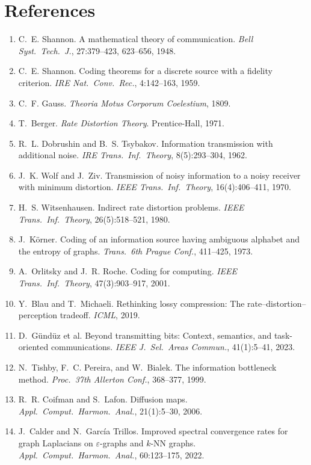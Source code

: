 \documentclass[lettersize,onecolumn]{IEEEtran}
\theoremstyle{definition}
\theoremstyle{remark}
\begin{document}
\section*{References}
\begin{enumerate}
\item  C.~E. Shannon. A mathematical theory of communication.
\emph{Bell Syst.\ Tech.\ J.}, 27:379--423, 623--656, 1948.
\item  C.~E. Shannon. Coding theorems for a discrete source with a
fidelity criterion. \emph{IRE Nat.\ Conv.\ Rec.}, 4:142--163, 1959.
\item  C.~F. Gauss. \emph{Theoria Motus Corporum Coelestium}, 1809.
\item  T.~Berger. \emph{Rate Distortion Theory}. Prentice-Hall, 1971.
\item  R.~L. Dobrushin and B.~S. Tsybakov. Information transmission
with additional noise. \emph{IRE Trans.\ Inf.\ Theory}, 8(5):293--304, 1962.
\item  J.~K. Wolf and J.~Ziv. Transmission of noisy information to a
noisy receiver with minimum distortion. \emph{IEEE Trans.\ Inf.\ Theory},
16(4):406--411, 1970.
\item  H.~S. Witsenhausen. Indirect rate distortion problems.
\emph{IEEE Trans.\ Inf.\ Theory}, 26(5):518--521, 1980.
\item  J.~K\"orner. Coding of an information source having ambiguous
alphabet and the entropy of graphs. \emph{Trans.\ 6th Prague Conf.}, 411--425, 1973.
\item  A.~Orlitsky and J.~R. Roche. Coding for computing.
\emph{IEEE Trans.\ Inf.\ Theory}, 47(3):903--917, 2001.
\item  Y.~Blau and T.~Michaeli. Rethinking lossy compression: The
rate--distortion--perception tradeoff. \emph{ICML}, 2019.
\item  D.~G\"und\"uz et al. Beyond transmitting bits: Context,
semantics, and task-oriented communications. \emph{IEEE J.\ Sel.\ Areas Commun.},
41(1):5--41, 2023.
\item  N.~Tishby, F.~C. Pereira, and W.~Bialek. The information
bottleneck method. \emph{Proc.\ 37th Allerton Conf.}, 368--377, 1999.
\item  R.~R. Coifman and S.~Lafon. Diffusion maps. \emph{Appl.\
Comput.\ Harmon.\ Anal.}, 21(1):5--30, 2006.
\item  J.~Calder and N.~Garc\'ia Trillos. Improved spectral
convergence rates for graph Laplacians on $\varepsilon$-graphs and $k$-NN graphs.
\emph{Appl.\ Comput.\ Harmon.\ Anal.}, 60:123--175, 2022.

\end{enumerate}
\end{document}
